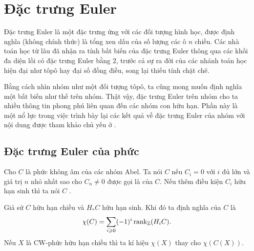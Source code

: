 
\chapter{Đặc trưng Euler}
Đặc trưng Euler là một đặc trưng ứng với các đối tượng hình học, được định nghĩa (không chính thức) là tổng xen dấu của số lượng các ô $n$ chiều. Các nhà toán học từ lâu đã nhận ra tính bất biến của đặc trưng Euler thông qua các khối đa diện lồi có đặc trưng Euler bằng $2$, trước cả sự ra đời của các nhánh toán học hiện đại như tôpô hay đại số đồng điều, song lại thiếu tính chặt chẽ.

Bằng cách nhìn nhóm như một đối tượng tôpô, ta cũng mong muốn định nghĩa một bất biến như thế trên nhóm. Thật vậy, đặc trưng Euler trên nhóm cho ta nhiều thông tin phong phú liên quan đến các nhóm con hữu hạn. Phần này là một nổ lực trong việc trình bày lại các kết quả về đặc trưng Euler của nhóm với nội dung được tham khảo chủ yếu ở \cite[Chương~IX]{CohomBrown}.

\section{Đặc trưng Euler của phức}
\begin{define}
    Cho $C$ là phức không âm của các nhóm Abel. Ta nói $C$  nếu $C_i = 0$ với $i$ đủ lớn và giá trị $n$ nhỏ nhất sao cho $C_n \neq 0$ được gọi là  của $C$. Nếu thêm điều kiện $C_i$ hữu hạn sinh thì ta nói $C$ .

    Giả sử $C$ hữu hạn chiều và $H_* C$ hữu hạn sinh. Khi đó ta định nghĩa  của $C$ là
    $$
        \chi(C) = \sum_{i \geqslant 0} (-1)^i \operatorname{rank}_{\mathbb Z} (H_i C).
    $$
    Nếu $X$ là CW-phức hữu hạn chiều thì ta kí hiệu $\chi(X)$ thay cho $\chi(C(X))$.
\end{define}

